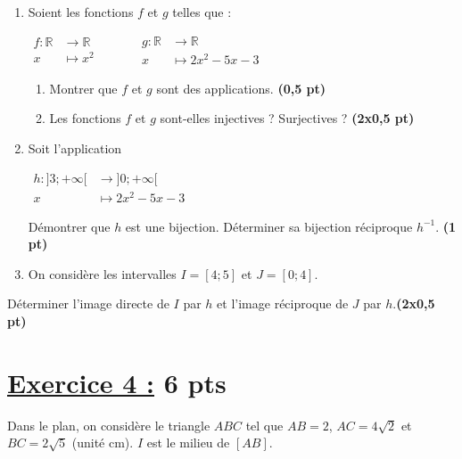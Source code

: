 \documentclass[12pt,a4paper]{article}
\begin{document}
\begin{enumerate}
    \item Soient les fonctions \( f \) et \( g \) telles que :
    
$
\begin{aligned}
        f : \mathbb{R} &\to \mathbb{R} \\
        x &\mapsto x^2
\end{aligned}\quad\quad\quad
\begin{aligned}
        g : \mathbb{R} &\to \mathbb{R} \\
        x &\mapsto 2x^2 - 5x - 3
\end{aligned}
$
    \begin{enumerate}
        \item Montrer que \( f \) et \( g \) sont des applications. \hfill \textbf{(0,5 pt)}
        \item Les fonctions \( f \) et \( g \) sont-elles injectives ? Surjectives ? \hfill \textbf{(2x0,5 pt)}
    \end{enumerate}

    \item Soit l’application 
    
$    
\begin{aligned}
        h : ]3 ; +\infty[ &\to ]0 ; +\infty[ \\
        x &\mapsto 2x^2 - 5x - 3
\end{aligned}
$
    
    Démontrer que \( h \) est une bijection. Déterminer sa bijection réciproque \( h^{-1} \). \hfill \textbf{(1 pt)}

    \item On considère les intervalles \( I = [4 ; 5] \) et \( J = [0 ; 4] \).
\end{enumerate}

Déterminer l’image directe de $I$ par $h$ et l’image réciproque de $J$ par $h$.\hfill \textbf{(2x0,5 pt)}

\section*{\underline{Exercice 4 :} 6 pts }
Dans le plan, on considère le triangle \( ABC \) tel que \( AB = 2 \), \( AC = 4\sqrt{2} \) et \( BC = 2\sqrt{5} \) (unité cm).  
\( I \) est le milieu de \( [AB] \).
\end{document}
